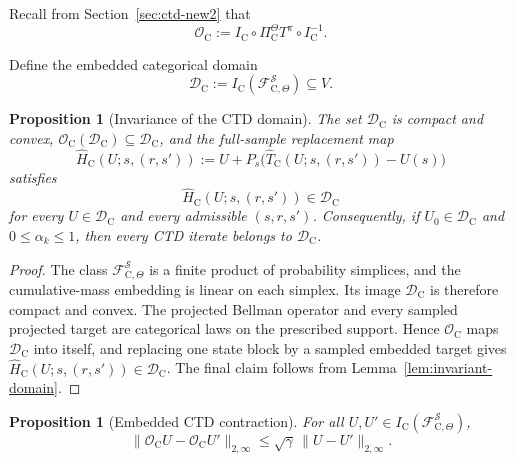 \documentclass{article}
\newtheorem{proposition}[theorem]{Proposition}
\newcommand{\X}{\mathcal{S}}
\begin{document}
Recall from Section~\ref{sec:ctd-new2} that
\begin{equation}
\mathcal O_{\mathrm C} := I_{\mathrm C}\circ \Pi_{\mathrm C}^{\Theta}T^\pi \circ I_{\mathrm C}^{-1}.
\end{equation}

Define the embedded categorical domain
\begin{equation}
\mathcal D_{\mathrm C}:=I_{\mathrm C}(\mathcal F^{\X}_{\mathrm C,\Theta})\subseteq V.
\end{equation}

\begin{proposition}[Invariance of the CTD domain]
\label{prop:ctd-domain}
The set $\mathcal D_{\mathrm C}$ is compact and convex, $\mathcal O_{\mathrm C}(\mathcal D_{\mathrm C})\subseteq\mathcal D_{\mathrm C}$, and the full-sample replacement map
\begin{equation}
\widehat H_{\mathrm C}(U;s,(r,s')):=U+P_s\bigl(\widehat T_{\mathrm C}(U;s,(r,s'))-U(s)\bigr)
\end{equation}
satisfies
\begin{equation}
\widehat H_{\mathrm C}(U;s,(r,s'))\in\mathcal D_{\mathrm C}
\end{equation}
for every $U\in\mathcal D_{\mathrm C}$ and every admissible $(s,r,s')$. Consequently, if $U_0\in\mathcal D_{\mathrm C}$ and $0\le\alpha_k\le1$, then every CTD iterate belongs to $\mathcal D_{\mathrm C}$.
\end{proposition}

\begin{proof}
The class $\mathcal F^{\X}_{\mathrm C,\Theta}$ is a finite product of probability simplices, and the cumulative-mass embedding is linear on each simplex. Its image $\mathcal D_{\mathrm C}$ is therefore compact and convex. The projected Bellman operator and every sampled projected target are categorical laws on the prescribed support. Hence $\mathcal O_{\mathrm C}$ maps $\mathcal D_{\mathrm C}$ into itself, and replacing one state block by a sampled embedded target gives $\widehat H_{\mathrm C}(U;s,(r,s'))\in\mathcal D_{\mathrm C}$. The final claim follows from Lemma~\ref{lem:invariant-domain}.
\end{proof}

\begin{proposition}[Embedded CTD contraction]
\label{prop:ctd-contraction-app}
For all $U,U'\in I_{\mathrm C}(\mathcal F^{\X}_{\mathrm C,\Theta})$,
\begin{equation}
\lVert \mathcal O_{\mathrm C}U-\mathcal O_{\mathrm C}U'\rVert_{2,\infty} \le \sqrt{\gamma}\,\lVert U-U'\rVert_{2,\infty}.
\end{equation}
\end{proposition}
\end{document}
